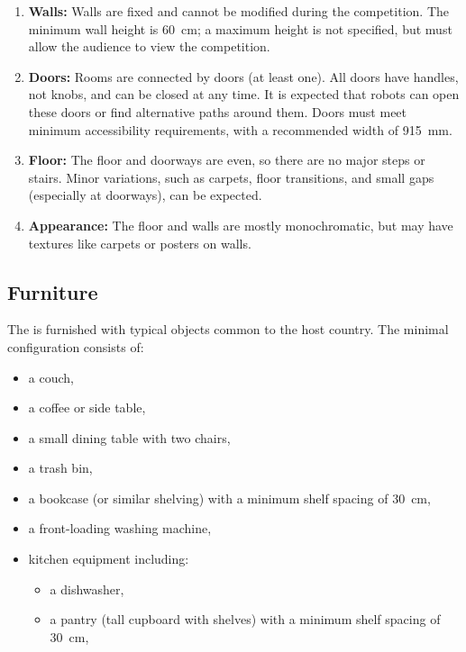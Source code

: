 \begin{enumerate}
	\item \textbf{Walls:} Walls are fixed and cannot be modified during the competition. The minimum wall height is \SI{60}{\centi\meter}; a maximum height is not specified, but must allow the audience to view the competition.
	\item \textbf{Doors:} Rooms are connected by doors (at least one). All doors have handles, not knobs, and can be closed at any time.
	It is expected that robots can open these doors or find alternative paths around them.
	Doors must meet minimum accessibility requirements, with a recommended width of \SI{915}{\milli\meter}.
	\item \textbf{Floor:} The floor and doorways are even, so there are no major steps or stairs. Minor variations, such as carpets, floor transitions, and small gaps (especially at doorways), can be expected.
	\item \textbf{Appearance:} The floor and walls are mostly monochromatic, but may have textures like carpets or posters on walls.
\end{enumerate}


\subsection{Furniture}\label{rule:scenario_furniture}

The \Arena{} is furnished with typical objects common to the host country.
The minimal configuration consists of:
\begin{itemize}
	\item a couch,
    \item a coffee or side table,
    \item a small dining table with two chairs,
    \item a trash bin,
    \item a bookcase (or similar shelving) with a minimum shelf spacing of \qty{30}{\centi\metre},
    \item a front-loading washing machine,
    \item kitchen equipment including:
    \begin{itemize}
        \item a dishwasher,
        \item a pantry (tall cupboard with shelves) with a minimum shelf spacing of \qty{30}{\centi\metre},
    \end{itemize}
\end{itemize}

